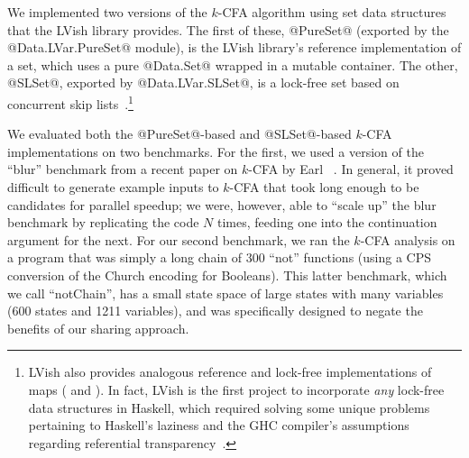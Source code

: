 We implemented two versions of the $k$-CFA algorithm using set data
structures that the LVish library provides.  The first of these,
@PureSet@ (exported by the @Data.LVar.PureSet@ module), is the LVish
library's reference implementation of a set, which uses a pure
@Data.Set@ wrapped in a mutable container.  The other, @SLSet@,
exported by @Data.LVar.SLSet@, is a lock-free set based on concurrent
skip lists~\cite{art}.\footnote{LVish also provides analogous
  reference and lock-free implementations of maps ( and
  ).  In fact, LVish is the first project to incorporate
  \emph{any} lock-free data structures in Haskell, which required
  solving some unique problems pertaining to Haskell's laziness and
  the GHC compiler's assumptions regarding referential
  transparency~\cite{RyanAtomicPrimopsTalk}.}

We evaluated both the @PureSet@-based and @SLSet@-based $k$-CFA
implementations on two benchmarks. For the first, we used a version of
the ``blur'' benchmark from a recent paper on $k$-CFA by Earl
\etal~.  In general, it proved
difficult to generate example inputs to $k$-CFA that took long enough
to be candidates for parallel speedup; we were, however, able to
``scale up'' the blur benchmark by replicating the code $N$ times,
feeding one into the continuation argument for the next.  For our
second benchmark, we ran the $k$-CFA analysis on a program that was
simply a long chain of $300$ ``not'' functions (using a CPS conversion
of the Church encoding for Booleans).  This latter benchmark, which we
call ``notChain'', has a small state space of large states with many
variables (600 states and 1211 variables), and was specifically
designed to negate the benefits of our sharing approach.

